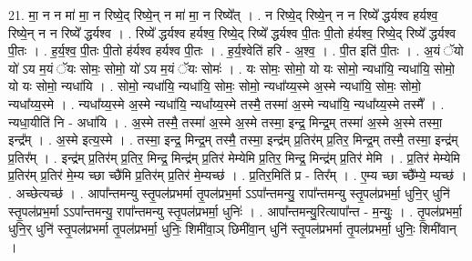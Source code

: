 \documentclass[17pt]{extarticle}
\begin{document}
21. मा॒ न न मा॑ मा॒ न रिष्ये॒द् रिष्ये॒न् न मा॑ मा॒ न रिष्ये᳚त् । . न रिष्ये॒द् रिष्ये॒न् न न रिष्ये᳚ द्धर्यश्व हर्यश्व॒ रिष्ये॒न् न न रिष्ये᳚ द्धर्यश्व । . रिष्ये᳚ द्धर्यश्व हर्यश्व॒ रिष्ये॒द् रिष्ये᳚ द्धर्यश्व पी॒तः पी॒तो ह॑र्यश्व॒ रिष्ये॒द् रिष्ये᳚ द्धर्यश्व पी॒तः । . ह॒र्य॒श्व॒ पी॒तः पी॒तो ह॑र्यश्व हर्यश्व पी॒तः । . ह॒र्य॒श्वेति॑ हरि - अ॒श्व॒ । . पी॒त इति॑ पी॒तः । . अ॒यं ॅयो यो॑ ऽय म॒यं ॅयः सोमः॒ सोमो॒ यो॑ ऽय म॒यं ॅयः सोमः॑ । . यः सोमः॒ सोमो॒ यो यः सोमो॒ न्यधा॑यि॒ न्यधा॑यि॒ सोमो॒ यो यः सोमो॒ न्यधा॑यि । . सोमो॒ न्यधा॑यि॒ न्यधा॑यि॒ सोमः॒ सोमो॒ न्यधा᳚य्य॒स्मे अ॒स्मे न्यधा॑यि॒ सोमः॒ सोमो॒ न्यधा᳚य्य॒स्मे । . न्यधा᳚य्य॒स्मे अ॒स्मे न्यधा॑यि॒ न्यधा᳚य्य॒स्मे तस्मै॒ तस्मा॑ अ॒स्मे न्यधा॑यि॒ न्यधा᳚य्य॒स्मे तस्मै᳚ । . न्यधा॒यीति॑ नि - अधा॑यि । . अ॒स्मे तस्मै॒ तस्मा॑ अ॒स्मे अ॒स्मे तस्मा॒ इन्द्र॒ मिन्द्र॒म् तस्मा॑ अ॒स्मे अ॒स्मे तस्मा॒ इन्द्र᳚म् । . अ॒स्मे इत्य॒स्मे । . तस्मा॒ इन्द्र॒ मिन्द्र॒म् तस्मै॒ तस्मा॒ इन्द्र॑म् प्र॒तिर॑म् प्र॒तिर॒ मिन्द्र॒म् तस्मै॒ तस्मा॒ इन्द्र॑म् प्र॒तिर᳚म् । . इन्द्र॑म् प्र॒तिर॑म् प्र॒तिर॒ मिन्द्र॒ मिन्द्र॑म् प्र॒तिर॑ मेम्येमि प्र॒तिर॒ मिन्द्र॒ मिन्द्र॑म् प्र॒तिर॑ मेमि । . प्र॒तिर॑ मेम्येमि प्र॒तिर॑म् प्र॒तिर॑ मे॒म्य च्छा च्छै॑मि प्र॒तिर॑म् प्र॒तिर॑ मे॒म्यच्छ॑ । . प्र॒तिर॒मिति॑ प्र - तिर᳚म् । . ए॒म्य च्छा च्छै᳚म्ये॒ म्यच्छ॑ । . अच्छेत्यच्छ॑ । . आपा᳚न्तमन्यु स्तृ॒पल॑प्रभर्मा तृ॒पल॑प्रभ॒र्मा ऽऽपा᳚न्तमन्यु॒ रापा᳚न्तमन्यु स्तृ॒पल॑प्रभर्मा॒ धुनि॒र् धुनि॑ स्तृ॒पल॑प्रभ॒र्मा ऽऽपा᳚न्तमन्यु॒ रापा᳚न्तमन्यु स्तृ॒पल॑प्रभर्मा॒ धुनिः॑ । . आपा᳚न्तमन्यु॒रित्यापा᳚न्त - म॒न्युः॒ । . तृ॒पल॑प्रभर्मा॒ धुनि॒र् धुनि॑ स्तृ॒पल॑प्रभर्मा तृ॒पल॑प्रभर्मा॒ धुनिः॒ शिमी॑वा॒ञ् छिमी॑वा॒न् धुनि॑ स्तृ॒पल॑प्रभर्मा तृ॒पल॑प्रभर्मा॒ धुनिः॒ शिमी॑वान् । \newline
\end{document}
